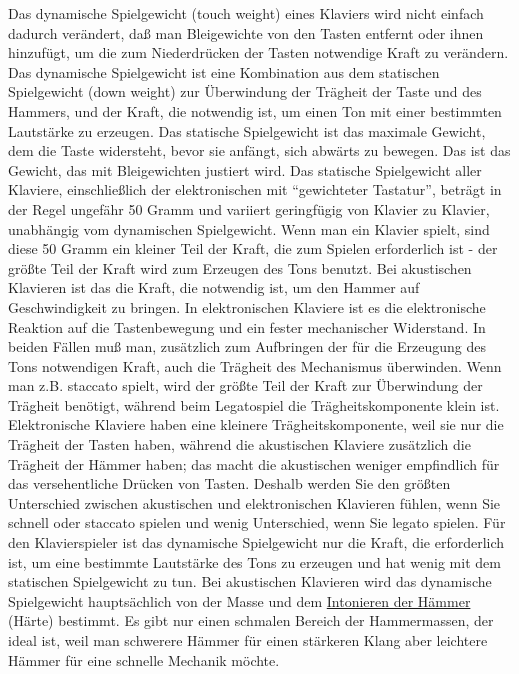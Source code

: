 Das dynamische Spielgewicht (touch weight) eines Klaviers wird nicht einfach dadurch verändert, daß man Bleigewichte von den Tasten entfernt oder ihnen hinzufügt, um die zum Niederdrücken der Tasten notwendige Kraft zu verändern.
Das dynamische Spielgewicht ist eine Kombination aus dem statischen Spielgewicht (down weight) zur Überwindung der Trägheit der Taste und des Hammers, und der Kraft, die notwendig ist, um einen Ton mit einer bestimmten Lautstärke zu erzeugen.
Das statische Spielgewicht ist das maximale Gewicht, dem die Taste widersteht, bevor sie anfängt, sich abwärts zu bewegen.
Das ist das Gewicht, das mit Bleigewichten justiert wird.
Das statische Spielgewicht aller Klaviere, einschließlich der elektronischen mit \enquote{gewichteter Tastatur}, beträgt in der Regel ungefähr 50 Gramm und variiert geringfügig von Klavier zu Klavier, unabhängig vom dynamischen Spielgewicht.
Wenn man ein Klavier spielt, sind diese 50 Gramm ein kleiner Teil der Kraft, die zum Spielen erforderlich ist - der größte Teil der Kraft wird zum Erzeugen des Tons benutzt.
Bei akustischen Klavieren ist das die Kraft, die notwendig ist, um den Hammer auf Geschwindigkeit zu bringen.
In elektronischen Klaviere ist es die elektronische Reaktion auf die Tastenbewegung und ein fester mechanischer Widerstand.
In beiden Fällen muß man, zusätzlich zum Aufbringen der für die Erzeugung des Tons notwendigen Kraft, auch die Trägheit des Mechanismus überwinden.
Wenn man z.B. staccato spielt, wird der größte Teil der Kraft zur Überwindung der Trägheit benötigt, während beim Legatospiel die Trägheitskomponente klein ist.
Elektronische Klaviere haben eine kleinere Trägheitskomponente, weil sie nur die Trägheit der Tasten haben, während die akustischen Klaviere zusätzlich die Trägheit der Hämmer haben; das macht die akustischen weniger empfindlich für das versehentliche Drücken von Tasten.
Deshalb werden Sie den größten Unterschied zwischen akustischen und elektronischen Klavieren fühlen, wenn Sie schnell oder staccato spielen und wenig Unterschied, wenn Sie legato spielen.
Für den Klavierspieler ist das dynamische Spielgewicht nur die Kraft, die erforderlich ist, um eine bestimmte Lautstärke des Tons zu erzeugen und hat wenig mit dem statischen Spielgewicht zu tun.
Bei akustischen Klavieren wird das dynamische Spielgewicht hauptsächlich von der Masse und dem \hyperref[c2_7_hamm]{Intonieren der Hämmer} (Härte) bestimmt.
Es gibt nur einen schmalen Bereich der Hammermassen, der ideal ist, weil man schwerere Hämmer für einen stärkeren Klang aber leichtere Hämmer für eine schnelle Mechanik möchte.
